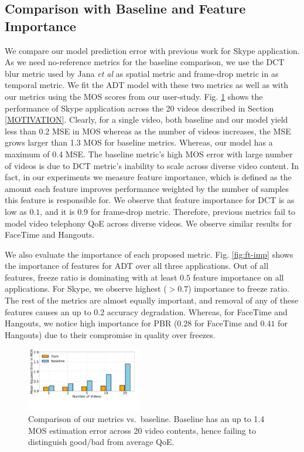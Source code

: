 \subsection{Comparison with Baseline and Feature Importance}
We compare our model prediction error with previous work for Skype application. As we need no-reference metrics for the baseline comparison, we use the DCT blur metric used by Jana {\em et al} as spatial metric and frame-drop metric in \cite{usman2017no} as temporal metric. We fit the ADT model with these two metrics as well as with our metrics using the MOS scores from our user-study. Fig. \ref{fig:baseline} shows the performance of Skype application across the 20 videos described in Section \ref{MOTIVATION}. Clearly, for a single video, both baseline and our model yield less than 0.2 MSE in MOS whereas as the number of videos increases, the MSE grows larger than 1.3 MOS for baseline metrics. Whereas, our model has a maximum of 0.4 MSE. The baseline metric's high MOS error with large number of videos is due to DCT metric's inability to scale across diverse video content. In fact, in our experiments we measure feature importance, which is defined as the amount each feature improves performance weighted by the number of samples this feature is responsible for. We observe that feature importance for DCT is as low as $0.1$, and it is $0.9$ for frame-drop metric. Therefore, previous metrics fail to model video telephony QoE across diverse videos. We observe similar results for FaceTime and Hangouts.

We also evaluate the importance of each proposed metric. Fig. \ref{fig:ft-imp} shows the importance of features for ADT over all three applications. Out of all features, freeze ratio is dominating with at least $0.5$ feature importance on all applications. For Skype, we observe highest ($>0.7$) importance to freeze ratio. The rest of the metrics are almost equally important, and removal of any of these features causes an up to 0.2 accuracy degradation. Whereas, for FaceTime and Hangouts, we notice high importance for PBR ($0.28$ for FaceTime and $0.41$ for Hangouts) due to their compromise in quality over freezes.
\begin{figure}[t]
      \centering
      \includegraphics[width=0.45\textwidth]{sections/network-work/baseline}
      \vspace{-3em}
      \caption{Comparison of our metrics vs.~baseline. Baseline has an up to 1.4 MOS estimation error across 20 video contents, hence failing to distinguish good/bad from average QoE. }
      \label{fig:baseline}
\end{figure}

